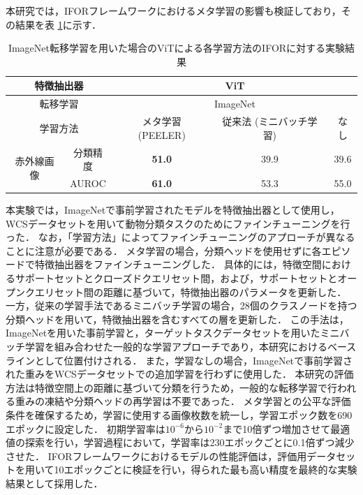 \documentclass[a4paper,11pt,nomag]{jsreport}
\begin{document}
本研究では，IFORフレームワークにおけるメタ学習の影響も検証しており，その結果を表 \ref{tbl:exp2}に示す．
% 
\begin{table}[tbp]
  \centering
  \caption{ImageNet転移学習を用いた場合のViTによる各学習方法のIFORに対する実験結果}
  \label{tbl:exp2}
  \begin{tabular}{cc||c|c|c}
      \hline
      \multicolumn{2}{c||}{特徴抽出器}       &          \multicolumn{3}{c}{ViT}                \\ \hline
      \multicolumn{2}{c||}{転移学習}         &          \multicolumn{3}{c}{ImageNet}           \\ \hline
      \multicolumn{2}{c||}{学習方法}         & メタ学習 (PEELER)  & 従来法 (ミニバッチ学習) & なし  \\ \hline\hline
      \multirow{2}{*}{赤外線画像} & 分類精度   &  \textbf{51.0}   &        39.9          & 39.6  \\
                                & AUROC     &  \textbf{61.0}   &        53.3          & 55.0  \\ \hline
  \end{tabular}
\end{table}
% 
本実験では，ImageNetで事前学習されたモデルを特徴抽出器として使用し，WCSデータセットを用いて動物分類タスクのためにファインチューニングを行った．
なお，「学習方法」によってファインチューニングのアプローチが異なることに注意が必要である．
メタ学習の場合，分類ヘッドを使用せずに各エピソードで特徴抽出器をファインチューニングした．
具体的には，特徴空間におけるサポートセットとクローズドクエリセット間，および，サポートセットとオープンクエリセット間の距離に基づいて，特徴抽出器のパラメータを更新した．
一方，従来の学習手法であるミニバッチ学習の場合，28個のクラスノードを持つ分類ヘッドを用いて，特徴抽出器を含むすべての層を更新した．
この手法は，ImageNetを用いた事前学習と，ターゲットタスクデータセットを用いたミニバッチ学習を組み合わせた一般的な学習アプローチであり，本研究におけるベースラインとして位置付けされる．
また，学習なしの場合，ImageNetで事前学習された重みをWCSデータセットでの追加学習を行わずに使用した．
本研究の評価方法は特徴空間上の距離に基づいて分類を行うため，一般的な転移学習で行われる重みの凍結や分類ヘッドの再学習は不要であった．
メタ学習との公平な評価条件を確保するため，学習に使用する画像枚数を統一し，学習エポック数を690エポックに設定した．
初期学習率は$10^{-6}$から$10^{-2}$まで10倍ずつ増加させて最適値の探索を行い，学習過程において，学習率は230エポックごとに0.1倍ずつ減少させた．
IFORフレームワークにおけるモデルの性能評価は，評価用データセットを用いて10エポックごとに検証を行い，得られた最も高い精度を最終的な実験結果として採用した．
\end{document}

